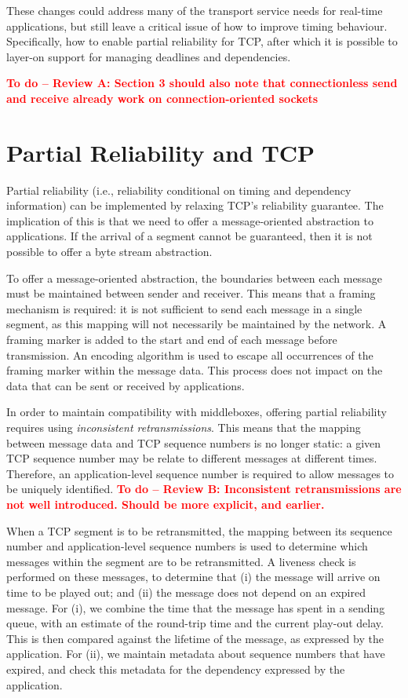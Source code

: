 \documentclass[10pt]{sig-alternate-05-2015}
\newcommand{\todo}[1]{\textbf{\textcolor{red}{To do -- #1}}}
\begin{document}
These changes could address many of the transport service needs for
real-time applications, but still leave a critical issue of how to improve
timing behaviour. Specifically, how to enable partial reliability for TCP,
after which it is possible to layer-on support for managing deadlines and
dependencies.

\todo{Review A: Section 3 should also note that connectionless send and
receive already work on connection-oriented sockets}

\section{Partial Reliability and TCP}
\label{sec:partial}

Partial reliability (i.e., reliability conditional on timing and dependency
information) can be implemented by relaxing TCP's reliability guarantee.
The implication of this is that we need to offer a message-oriented
abstraction to applications. If the arrival of a segment cannot be
guaranteed, then it is not possible to offer a byte stream abstraction.

To offer a message-oriented abstraction, the boundaries between each
message must be maintained between sender and receiver. This means that a
framing mechanism is required: it is not sufficient to send each message in
a single segment, as this mapping will not necessarily be maintained by the
network. A framing marker is added to the start and end of each message
before transmission. An encoding algorithm is used to escape all occurrences
of the framing marker within the message data. This process does not impact
on the data that can be sent or received by applications.

In order to maintain compatibility with middleboxes, offering partial
reliability requires using \emph{inconsistent retransmissions}. This means
that the mapping between message data and TCP sequence numbers is no longer
static: a given TCP sequence number may be relate to different messages at
different times. Therefore, an application-level sequence number is
required to allow messages to be uniquely identified.
\todo{Review B: Inconsistent retransmissions are not well introduced. Should
be more explicit, and earlier.}

When a TCP segment is to be retransmitted, the mapping between its
sequence number and application-level sequence numbers is used to determine
which messages within the segment are to be retransmitted. A liveness check
is performed on these messages, to determine that (i) the message will
arrive on time to be played out; and (ii) the message does not depend on an
expired message. For (i), we combine the time that the message has spent in
a sending queue, with an estimate of the round-trip time and the current
play-out delay. This is then compared against the lifetime of the message,
as expressed by the application. For (ii), we maintain metadata about
sequence numbers that have expired, and check this metadata for the
dependency expressed by the application.
\end{document}
